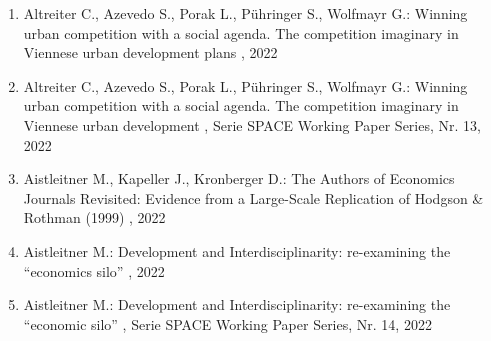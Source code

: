 \begin{enumerate}[leftmargin=*, labelsep=0.5cm]
	 \item Altreiter C., Azevedo S., Porak L., Pühringer S., Wolfmayr G.:  Winning urban competition with a social agenda. The competition imaginary in Viennese urban development plans  , 2022
	 \item Altreiter C., Azevedo S., Porak L., Pühringer S., Wolfmayr G.:  Winning urban competition with a social agenda. The competition imaginary in Viennese urban development  , Serie SPACE Working Paper Series, Nr. 13, 2022
	 \item Aistleitner M., Kapeller J., Kronberger D.:  The Authors of Economics Journals Revisited: Evidence from a Large-Scale Replication of Hodgson & Rothman (1999)  , 2022
	 \item Aistleitner M.:  Development and Interdisciplinarity: re-examining the “economics silo”  , 2022
	 \item Aistleitner M.:  Development and Interdisciplinarity: re-examining the “economic silo”  , Serie SPACE Working Paper Series, Nr. 14, 2022
\end{enumerate} 
